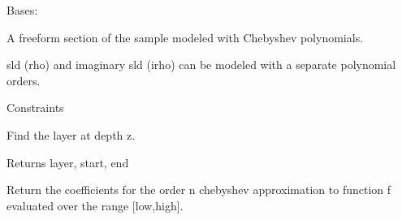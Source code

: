 \documentclass[letterpaper,10pt,english]{sphinxmanual}
\begin{document}
\begin{fulllineitems}
\label{api/cheby:refl1d.cheby.FreeformCheby}
Bases: {\hyperref[api/model:refl1d.model.Layer]{}}

A freeform section of the sample modeled with Chebyshev polynomials.

sld (rho) and imaginary sld (irho) can be modeled with a separate
polynomial orders.

\begin{fulllineitems}
\label{api/cheby:refl1d.cheby.FreeformCheby.constraints}
Constraints

\end{fulllineitems}


\begin{fulllineitems}
\label{api/cheby:refl1d.cheby.FreeformCheby.find}
Find the layer at depth z.

Returns layer, start, end

\end{fulllineitems}


\begin{fulllineitems}
\label{api/cheby:refl1d.cheby.FreeformCheby.parameters}
\end{fulllineitems}


\begin{fulllineitems}
\label{api/cheby:refl1d.cheby.FreeformCheby.render}
\end{fulllineitems}


\end{fulllineitems}


\begin{fulllineitems}
\label{api/cheby:refl1d.cheby.cheby_approx}
Return the coefficients for the order n chebyshev approximation to
function f evaluated over the range {[}low,high{]}.

\end{fulllineitems}
\end{document}
